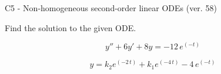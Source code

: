 \begin{exercise}
  \begin{exerciseTitle}C5 - Non-homogeneous second-order linear ODEs (ver. 58)\end{exerciseTitle}
  \begin{exerciseStatement}
    
Find the solution to the given ODE.

    
\[y''+6y'+8y = -12 \, e^{\left(-t\right)}\]

  \end{exerciseStatement}
  \begin{exerciseAnswer}
    
\[y= k_{2} e^{\left(-2 \, t\right)} + k_{1} e^{\left(-4 \, t\right)} - 4 \, e^{\left(-t\right)}\]

  \end{exerciseAnswer}
\end{exercise}